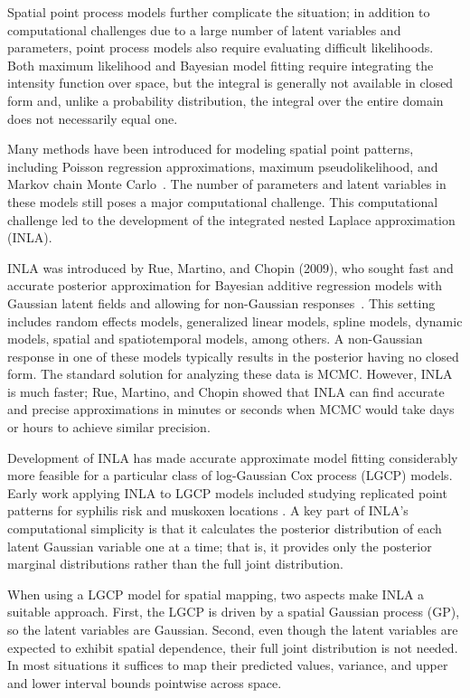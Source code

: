\documentclass{interact}
\begin{document}
Spatial point process models further complicate the situation; in addition to
computational challenges due to a large number of latent variables and
parameters, point process models also require evaluating difficult
likelihoods. Both maximum likelihood and Bayesian model fitting require
integrating the intensity function over space, but the integral is generally
not available in closed form and, unlike a probability distribution, the
integral over the entire domain does not necessarily equal one.

Many methods have been introduced for modeling spatial point patterns,
including Poisson regression approximations, maximum pseudolikelihood, and
Markov chain Monte
Carlo~\cite{bermanturner,baddeleyetal,baddeleyturner,moellerwaagepetersen}.
The number of parameters and latent variables in these models still poses a
major computational challenge. This computational challenge led to the
development of the integrated nested Laplace approximation (INLA).

INLA was introduced by Rue, Martino, and Chopin (2009), who sought fast and
accurate posterior approximation for Bayesian additive regression models with
Gaussian latent fields and allowing for non-Gaussian responses~\cite{rueetal}.
This setting includes random effects models, generalized linear models, spline
models, dynamic models, spatial and spatiotemporal models, among others.
A non-Gaussian response in one of these models typically results in the
posterior having no closed form. The standard solution for analyzing these
data is MCMC. However, INLA is much faster; Rue,
Martino, and Chopin showed that INLA can find accurate and precise
approximations in minutes or seconds when MCMC would take days or hours to
achieve similar precision.

Development of INLA has made accurate approximate model fitting considerably
more feasible for a particular class of log-Gaussian Cox process (LGCP)
models. Early work applying INLA to LGCP models included studying replicated point patterns for syphilis risk \cite{li2012log} and muskoxen locations \cite{illian2012using}. A key part of INLA's computational simplicity is that it calculates
the posterior distribution of each latent Gaussian variable one at a time;
that is, it provides only the posterior marginal distributions rather than the
full joint distribution.

When using a LGCP model for spatial mapping, two aspects make INLA a suitable
approach. First, the LGCP is driven by a spatial Gaussian process (GP), so the
latent variables are Gaussian. Second, even though the latent variables are
expected to exhibit spatial dependence, their full joint distribution is not
needed. In most situations it suffices to map their predicted values, variance,
and upper and lower interval bounds pointwise across space.
\end{document}
